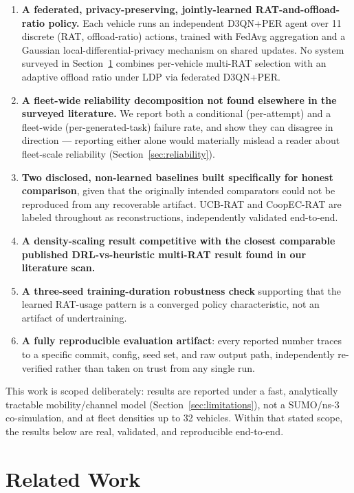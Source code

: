 \documentclass[journal,10pt,twocolumn]{IEEEtran}
\begin{document}
\begin{enumerate}
\item \textbf{A federated, privacy-preserving, jointly-learned RAT-and-offload-ratio policy.} Each
vehicle runs an independent D3QN+PER agent over 11 discrete (RAT, offload-ratio) actions, trained
with FedAvg aggregation and a Gaussian local-differential-privacy mechanism on shared updates. No
system surveyed in Section~\ref{sec:related} combines per-vehicle multi-RAT selection with an
adaptive offload ratio under LDP via federated D3QN+PER.
\item \textbf{A fleet-wide reliability decomposition not found elsewhere in the surveyed
literature.} We report both a conditional (per-attempt) and a fleet-wide (per-generated-task)
failure rate, and show they can disagree in direction --- reporting either alone would materially
mislead a reader about fleet-scale reliability (Section~\ref{sec:reliability}).
\item \textbf{Two disclosed, non-learned baselines built specifically for honest comparison}, given
that the originally intended comparators could not be reproduced from any recoverable artifact.
UCB-RAT and CoopEC-RAT are labeled throughout as reconstructions, independently validated
end-to-end.
\item \textbf{A density-scaling result competitive with the closest comparable published
DRL-vs-heuristic multi-RAT result found in our literature scan.}
\item \textbf{A three-seed training-duration robustness check} supporting that the learned
RAT-usage pattern is a converged policy characteristic, not an artifact of undertraining.
\item \textbf{A fully reproducible evaluation artifact}: every reported number traces to a specific
commit, config, seed set, and raw output path, independently re-verified rather than taken on trust
from any single run.
\end{enumerate}

This work is scoped deliberately: results are reported under a fast, analytically tractable
mobility/channel model (Section~\ref{sec:limitations}), not a SUMO/ns-3 co-simulation, and at fleet
densities up to 32 vehicles. Within that stated scope, the results below are real, validated, and
reproducible end-to-end.

\section{Related Work}
\label{sec:related}
\end{document}
